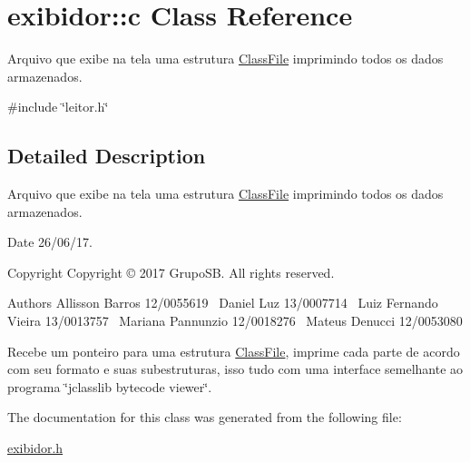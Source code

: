 \hypertarget{classexibidor_1_1c}{}\section{exibidor\+:\+:c Class Reference}
\label{classexibidor_1_1c}


Arquivo que exibe na tela uma estrutura \hyperlink{structClassFile}{Class\+File} imprimindo todos os dados armazenados.  




{\ttfamily \#include \char`\"{}leitor.\+h\char`\"{}}



\subsection{Detailed Description}
Arquivo que exibe na tela uma estrutura \hyperlink{structClassFile}{Class\+File} imprimindo todos os dados armazenados. 

\begin{DoxyDate}{Date}
26/06/17. 
\end{DoxyDate}
\begin{DoxyCopyright}{Copyright}
Copyright © 2017 Grupo\+SB. All rights reserved.
\end{DoxyCopyright}
\begin{DoxyAuthor}{Authors}
Allisson Barros 12/0055619~\newline
Daniel Luz 13/0007714~\newline
Luiz Fernando Vieira 13/0013757~\newline
Mariana Pannunzio 12/0018276~\newline
Mateus Denucci 12/0053080
\end{DoxyAuthor}
Recebe um ponteiro para uma estrutura \hyperlink{structClassFile}{Class\+File}, imprime cada parte de acordo com seu formato e suas subestruturas, isso tudo com uma interface semelhante ao programa \char`\"{}jclasslib bytecode viewer\char`\"{}. 

The documentation for this class was generated from the following file\+:\begin{DoxyCompactItemize}
\item 
\hyperlink{exibidor_8h}{exibidor.\+h}\end{DoxyCompactItemize}
